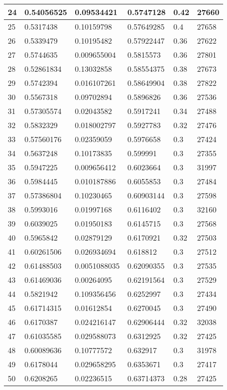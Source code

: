 \begin{longtable}{|l|l|l|l|l|l|}
24 & 0.54056525 & 0.09534421 & 0.5747128 & 0.42 & 27660 \\ \hline 
25 & 0.5317438 & 0.10159798 & 0.57649285 & 0.4 & 27658 \\ \hline 
26 & 0.5339479 & 0.10195482 & 0.57922447 & 0.36 & 27622 \\ \hline 
27 & 0.5744635 & 0.009655004 & 0.5815573 & 0.36 & 27801 \\ \hline 
28 & 0.52861834 & 0.13032858 & 0.58554375 & 0.38 & 27673 \\ \hline 
29 & 0.5742394 & 0.016107261 & 0.58649904 & 0.38 & 27822 \\ \hline 
30 & 0.5567318 & 0.09702894 & 0.5896826 & 0.36 & 27536 \\ \hline 
31 & 0.57305574 & 0.02043582 & 0.5917241 & 0.34 & 27488 \\ \hline 
32 & 0.5832329 & 0.018002797 & 0.5927783 & 0.32 & 27476 \\ \hline 
33 & 0.57560176 & 0.02359059 & 0.5976658 & 0.3 & 27424 \\ \hline 
34 & 0.5637248 & 0.10173835 & 0.599991 & 0.3 & 27355 \\ \hline 
35 & 0.5947225 & 0.009656412 & 0.6023664 & 0.3 & 31997 \\ \hline 
36 & 0.5984445 & 0.010187886 & 0.6055853 & 0.3 & 27484 \\ \hline 
37 & 0.57386804 & 0.10230465 & 0.60903144 & 0.3 & 27598 \\ \hline 
38 & 0.5993016 & 0.01997168 & 0.6116402 & 0.3 & 32160 \\ \hline 
39 & 0.6039025 & 0.01950183 & 0.6145715 & 0.3 & 27568 \\ \hline 
40 & 0.5965842 & 0.02879129 & 0.6170921 & 0.32 & 27503 \\ \hline 
41 & 0.60261506 & 0.026934694 & 0.618812 & 0.3 & 27512 \\ \hline 
42 & 0.61488503 & 0.0051088035 & 0.62090355 & 0.3 & 27535 \\ \hline 
43 & 0.61469036 & 0.00264095 & 0.62191564 & 0.3 & 27529 \\ \hline 
44 & 0.5821942 & 0.109356456 & 0.6252997 & 0.3 & 27434 \\ \hline 
45 & 0.61714315 & 0.01612854 & 0.6270045 & 0.3 & 27490 \\ \hline 
46 & 0.6170387 & 0.024216147 & 0.62906444 & 0.32 & 32038 \\ \hline 
47 & 0.61035585 & 0.029588073 & 0.6312925 & 0.32 & 27425 \\ \hline 
48 & 0.60089636 & 0.10777572 & 0.632917 & 0.3 & 31978 \\ \hline 
49 & 0.6178044 & 0.029658295 & 0.6353671 & 0.3 & 27417 \\ \hline 
50 & 0.6208265 & 0.02236515 & 0.63714373 & 0.28 & 27425 \\ \hline 
\end{longtable}